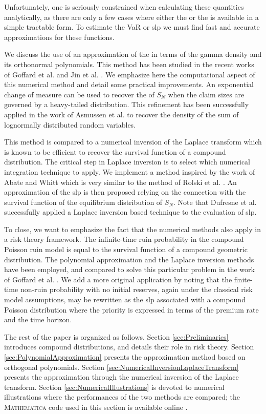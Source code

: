Unfortunately, one is seriously constrained when calculating these quantities analytically, as there are only a few cases where either the \pdf or the \svf is available in a simple tractable form. To estimate the VaR or slp we must find fast and accurate approximations for these functions.

We discuss the use of an approximation of the \pdf in terms of the gamma density and its orthonormal polynomials. This method has been studied in the recent works of Goffard et al. \cite{GoLoPo15} and Jin et al. \cite{JiPrRe16}. We emphasize here the computational aspect of this numerical method and detail some practical improvements. An exponential change of measure can be used to recover the \pdf of $S_N$ when the claim sizes are governed by a heavy-tailed distribution. This refinement has been successfully applied in the work of Asmussen et al. \cite{asmussen2016orthonormal} to recover the density of the sum of lognormally distributed random variables.

This method is compared to a numerical inversion of the Laplace transform which is known to be efficient to recover the survival function of a compound distribution. The critical step in Laplace inversion is to select which numerical integration technique to apply. We implement a method inspired by the work of Abate and Whitt \cite{Abate1992} which is very similar to the method of Rolski et al. \cite[Chapter 5, Section 5]{RoScScTe08}. An approximation of the slp is then proposed relying on the connection with the survival function of the equilibrium distribution of $S_N$. Note that Dufresne et al. \cite{DuGaMo09} successfully applied a Laplace inversion based technique to the evaluation of slp.

To close, we want to emphasize the fact that the numerical methods also apply in a risk theory framework. The infinite-time ruin probability in the compound Poisson ruin model is equal to the survival function of a compound geometric distribution. The polynomial approximation and the Laplace inversion methods have been employed, and compared to solve this particular problem in the work of Goffard et al. \cite{GoLoPo16}. We add a more original application by noting that the finite-time non-ruin probability with no initial reserves, again under the classical risk model assumptions, may be rewritten as the slp associated with a compound Poisson distribution where the priority is expressed in terms of the premium rate and the time horizon.

The rest of the paper is organized as follows. Section \ref{sec:Preliminaries} introduces compound distributions, and details their role in risk theory. Section \ref{sec:PolynomialApproximation} presents the approximation method based on orthogonal polynomials. Section \ref{sec:NumericalInversionLaplaceTransform} presents the approximation through the numerical inversion of the Laplace transform. Section \ref{sec:NumericalIllustrations} is devoted to numerical illustrations where the performances of the two methods are compared; the \textsc{Mathematica} code used in this section is available online \cite{StoplossCode}.

